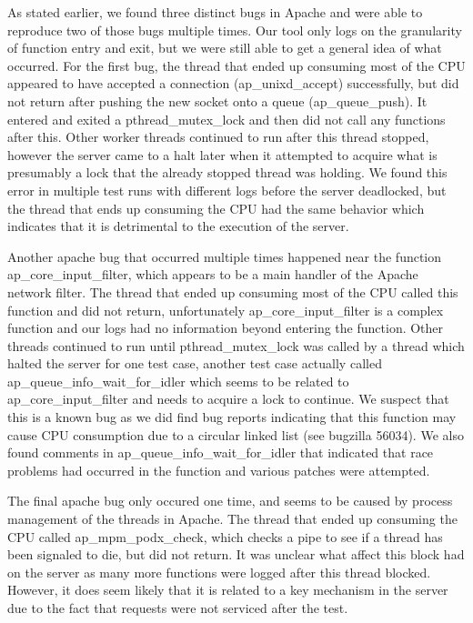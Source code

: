 \documentclass[10pt,]{article} %
\begin{document}
As stated earlier, we found three distinct bugs in Apache and were able to reproduce two of those bugs multiple times. Our tool only logs on the granularity of function entry and exit, but we were still able to get a general idea of what occurred. For the first bug, the thread that ended up consuming most of the CPU appeared to have accepted a connection (ap\_unixd\_accept) successfully, but did not return after pushing the new socket onto a queue (ap\_queue\_push). It entered and exited a pthread\_mutex\_lock and then did not call any functions after this. Other worker threads continued to run after this thread stopped, however the server came to a halt later when it attempted to acquire what is presumably a lock that the already stopped thread was holding. We found this error in multiple test runs with different logs before the server deadlocked, but the thread that ends up consuming the CPU had the same behavior which indicates that it is detrimental to the execution of the server. 

Another apache bug that occurred multiple times happened near the function ap\_core\_input\_filter, which appears to be a main handler of the Apache network filter. The thread that ended up consuming most of the CPU called this function and did not return, unfortunately ap\_core\_input\_filter is a complex function and our logs had no information beyond entering the function. Other threads continued to run until pthread\_mutex\_lock was called by a thread which halted the server for one test case, another test case actually called ap\_queue\_info\_wait\_for\_idler which seems to be related to ap\_core\_input\_filter and needs to acquire a lock to continue. We suspect that this is a known bug as we did find bug reports indicating that this function may cause CPU consumption due to a circular linked list (see bugzilla 56034). We also found comments in ap\_queue\_info\_wait\_for\_idler that indicated that race problems had occurred in the function and various patches were attempted. 

The final apache bug only occured one time, and seems to be caused by process management of the threads in Apache. The thread that ended up consuming the CPU called ap\_mpm\_podx\_check, which checks a pipe to see if a thread has been signaled to die, but did not return. It was unclear what affect this block had on the server as many more functions were logged after this thread blocked. However, it does seem likely that it is related to a key mechanism in the server due to the fact that requests were not serviced after the test. 
\end{document}
